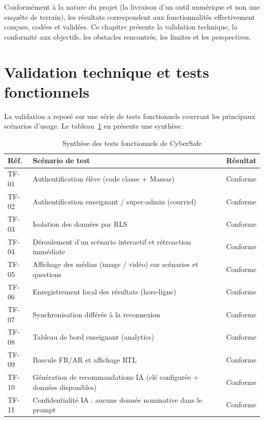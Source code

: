 \documentclass[12pt, a4paper, oneside]{report}
\begin{document}
Conformément à la nature du projet (la livraison d'un outil numérique et non une enquête de terrain), les résultats correspondent aux fonctionnalités effectivement conçues, codées et validées. Ce chapitre présente la validation technique, la conformité aux objectifs, les obstacles rencontrés, les limites et les perspectives.

\section{Validation technique et tests fonctionnels}
La validation a reposé sur une série de tests fonctionnels couvrant les principaux scénarios d'usage. Le tableau~\ref{tab:tests} en présente une synthèse.

\begin{table}[H]
\centering
\caption{Synthèse des tests fonctionnels de CyberSafe}
\label{tab:tests}
\begin{tabularx}{\textwidth}{@{}l X c@{}}
\toprule
\textbf{Réf.} & \textbf{Scénario de test} & \textbf{Résultat} \\
\midrule
TF-01 & Authentification élève (code classe + Massar) & Conforme \\
TF-02 & Authentification enseignant / super-admin (courriel) & Conforme \\
TF-03 & Isolation des données par RLS & Conforme \\
TF-04 & Déroulement d'un scénario interactif et rétroaction immédiate & Conforme \\
TF-05 & Affichage des médias (image / vidéo) sur scénarios et questions & Conforme \\
TF-06 & Enregistrement local des résultats (hors-ligne) & Conforme \\
TF-07 & Synchronisation différée à la reconnexion & Conforme \\
TF-08 & Tableau de bord enseignant (analytics) & Conforme \\
TF-09 & Bascule FR/AR et affichage RTL & Conforme \\
TF-10 & Génération de recommandations IA (clé configurée + données disponibles) & Conforme \\
TF-11 & Confidentialité IA : aucune donnée nominative dans le prompt & Conforme \\
\bottomrule
\end{tabularx}
\end{table}
\end{document}
